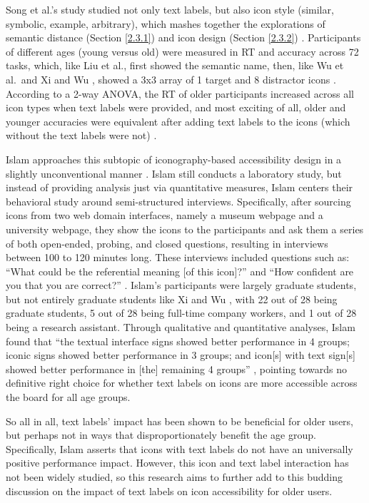 \documentclass[12pt,twoside]{reedthesis}
\begin{document}
    Song et al.\@'s study studied not only text labels, but also icon style (similar, symbolic, example, arbitrary), which mashes together the explorations of semantic distance (Section \ref{2.3.1}) and icon design (Section \ref{2.3.2}) \cite{song_developing_2024}. Participants of different ages (young versus old) were measured in RT and accuracy across 72 tasks, which, like Liu et al.\@, first showed the semantic name, then, like Wu et al.~and Xi and Wu \cite{wu_how_2022, xi_influence_2018}, showed a 3x3 array of 1 target and 8 distractor icons \cite{liu_study_2023}. According to a 2-way ANOVA, the RT of older participants increased across all icon types when text labels were provided, and most exciting of all, older and younger accuracies were equivalent after adding text labels to the icons (which without the text labels were not) \cite{song_developing_2024}. 

    Islam approaches this subtopic of iconography-based accessibility design in a slightly unconventional manner \cite{islam_exploring_2015}. Islam still conducts a laboratory study, but instead of providing analysis just via quantitative measures, Islam centers their behavioral study around semi-structured interviews. Specifically, after sourcing icons from two web domain interfaces, namely a museum webpage and a university webpage, they show the icons to the participants and ask them a series of both open-ended, probing, and closed questions, resulting in interviews between 100 to 120 minutes long. These interviews included questions such as: \enquote{What could be the referential meaning [of this icon]?} and \enquote{How confident are you that you are correct?} \cite{islam_exploring_2015}. Islam's participants were largely graduate students, but not entirely graduate students like Xi and Wu \cite{xi_influence_2018}, with 22 out of 28 being graduate students, 5 out of 28 being full-time company workers, and 1 out of 28 being a research assistant. Through qualitative and quantitative analyses, Islam found that \enquote{the textual interface signs showed better performance in 4 groups; iconic signs showed better performance in 3 groups; and icon[s] with text sign[s] showed better performance in [the] remaining 4 groups} \cite{islam_exploring_2015}, pointing towards no definitive right choice for whether text labels on icons are more accessible across the board for all age groups. 

    So all in all, text labels' impact has been shown to be beneficial for older users, but perhaps not in ways that disproportionately benefit the age group. Specifically, Islam asserts that icons with text labels do not have an universally positive performance impact. However, this icon and text label interaction has not been widely studied, so this research aims to further add to this budding discussion on the impact of text labels on icon accessibility for older users.
\end{document}
